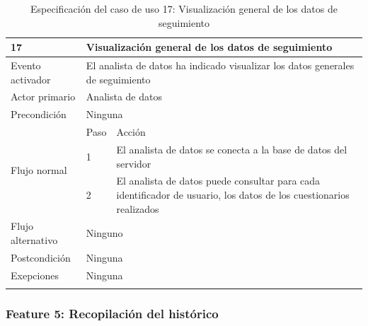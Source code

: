     \begin{table}[h]
        \centering
        \begin{tabularx}{\textwidth}{|l|l|X|}
            \hline
            17 & \multicolumn{2}{|X|}{Visualización general de los datos de seguimiento} \\
            \hline
            Evento activador & \multicolumn{2}{|X|}{El analista de datos ha indicado visualizar los datos generales de seguimiento} \\
            \hline
            Actor primario & \multicolumn{2}{|X|}{Analista de datos} \\
            \hline
            Precondición & \multicolumn{2}{|X|}{Ninguna} \\
            \hline
            \multirow{3}{*}{Flujo normal} & Paso & Acción \\
            \cline{2-3} & 1 & El analista de datos se conecta a la base de datos del servidor \\
            \cline{2-3} & 2 & El analista de datos puede consultar para cada identificador de usuario, los datos de los cuestionarios realizados \\
            \hline
            Flujo alternativo & \multicolumn{2}{|X|}{Ninguno} \\
            \hline
            Postcondición & \multicolumn{2}{|X|}{Ninguna} \\
            \hline
            Exepciones & \multicolumn{2}{|X|}{Ninguna} \\
            \hline
            \caption{Especificación del caso de uso 17: Visualización general de los datos de seguimiento}
            \label{tabla:casos_uso:visualizacion_general_seguimiento}
        \end{tabularx}
    \end{table}

    \subsubsection{Feature 5: Recopilación del histórico}

